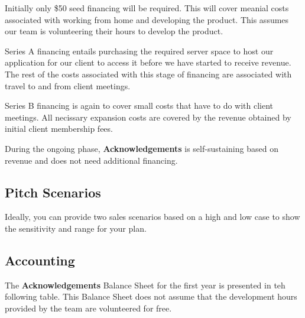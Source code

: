 Initially only \$50 seed financing will be required. This will cover meanial costs associated with working from home and developing the product. This assumes our team is volunteering their hours to develop the product.

Series A financing entails purchasing the required server space to host our application for our client to access it before we have started to receive revenue. The rest of the costs associated with this stage of financing are associated with travel to and from client meetings.

Series B financing is again to cover small costs that have to do with client meetings. All necissary expansion costs are covered by the revenue obtained by initial client membership fees.

During the ongoing phase, {\bf Acknowledgements} is self-sustaining based on revenue and does not need additional financing.

\subsection{Pitch Scenarios}
Ideally, you can provide two sales scenarios
based on a high and low case to show the sensitivity and range for your plan.

\subsection{Accounting}
The {\bf Acknowledgements} Balance Sheet for the first year is presented in teh following table. This Balance Sheet does not assume that the development hours provided by the team are volunteered for free.

